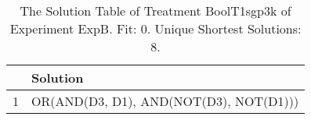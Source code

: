 \begin{table}[ht]
\centering
\begin{tabular}{rp{9cm}}
  \hline
 & Solution \\ 
  \hline
1 & OR(AND(D3, D1), AND(NOT(D3), NOT(D1))) \\ 
   \hline
\end{tabular}
\caption{The Solution Table of Treatment BoolT1sgp3k of Experiment ExpB. Fit: 0. Unique Shortest Solutions: 8.} 
\end{table}
